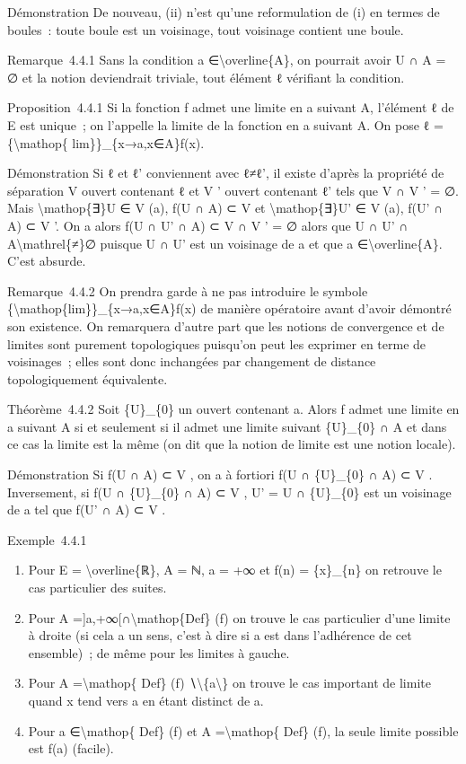 \documentclass[]{article}
\begin{document}
Démonstration De nouveau, (ii) n'est qu'une reformulation de (i) en
termes de boules~: toute boule est un voisinage, tout voisinage contient
une boule.

Remarque~4.4.1 Sans la condition a ∈\textbackslash{}overline\{A\}, on
pourrait avoir U ∩ A = ∅ et la notion deviendrait triviale, tout élément
ℓ vérifiant la condition.

Proposition~4.4.1 Si la fonction f admet une limite en a suivant A,
l'élément ℓ de E est unique~; on l'appelle la limite de la fonction en a
suivant A. On pose ℓ =\{\textbackslash{}mathop\{
lim\}\}\_\{x→a,x∈A\}f(x).

Démonstration Si ℓ et ℓ' conviennent avec ℓ≠ℓ', il existe d'après la
propriété de séparation V ouvert contenant ℓ et V ' ouvert contenant ℓ'
tels que V ∩ V ' = ∅. Mais \textbackslash{}mathop\{∃\}U ∈ V (a), f(U ∩
A) ⊂ V et \textbackslash{}mathop\{∃\}U' ∈ V (a), f(U' ∩ A) ⊂ V '. On a
alors f(U ∩ U' ∩ A) ⊂ V ∩ V ' = ∅ alors que U ∩ U' ∩
A\textbackslash{}mathrel\{≠\}∅ puisque U ∩ U' est un voisinage de a et
que a ∈\textbackslash{}overline\{A\}. C'est absurde.

Remarque~4.4.2 On prendra garde à ne pas introduire le symbole
\{\textbackslash{}mathop\{lim\}\}\_\{x→a,x∈A\}f(x) de manière opératoire
avant d'avoir démontré son existence. On remarquera d'autre part que les
notions de convergence et de limites sont purement topologiques
puisqu'on peut les exprimer en terme de voisinages~; elles sont donc
inchangées par changement de distance topologiquement équivalente.

Théorème~4.4.2 Soit \{U\}\_\{0\} un ouvert contenant a. Alors f admet
une limite en a suivant A si et seulement si il admet une limite suivant
\{U\}\_\{0\} ∩ A et dans ce cas la limite est la même (on dit que la
notion de limite est une notion locale).

Démonstration Si f(U ∩ A) ⊂ V , on a à fortiori f(U ∩ \{U\}\_\{0\} ∩ A)
⊂ V . Inversement, si f(U ∩ \{U\}\_\{0\} ∩ A) ⊂ V , U' = U ∩
\{U\}\_\{0\} est un voisinage de a tel que f(U' ∩ A) ⊂ V .

Exemple~4.4.1

\begin{enumerate}
\itemsep1pt\parskip0pt
\item
  Pour E = \textbackslash{}overline\{ℝ\}, A = ℕ, a = +∞ et f(n) =
  \{x\}\_\{n\} on retrouve le cas particulier des suites.
\item
  Pour A ={]}a,+∞{[}∩\textbackslash{}mathop\{Def\} (f) on trouve le cas
  particulier d'une limite à droite (si cela a un sens, c'est à dire si
  a est dans l'adhérence de cet ensemble)~; de même pour les limites à
  gauche.
\item
  Pour A =\textbackslash{}mathop\{ Def\} (f)
  ∖\textbackslash{}\{a\textbackslash{}\} on trouve le cas important de
  limite quand x tend vers a en étant distinct de a.
\item
  Pour a ∈\textbackslash{}mathop\{ Def\} (f) et A
  =\textbackslash{}mathop\{ Def\} (f), la seule limite possible est f(a)
  (facile).
\end{enumerate}
\end{document}
